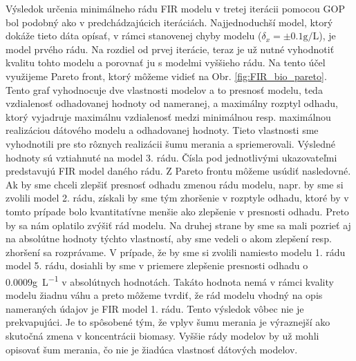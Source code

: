 Výsledok určenia minimálneho rádu FIR modelu v tretej iterácii pomocou GOP bol podobný ako v predchádzajúcich iteráciách. Najjednoduchší model, ktorý dokáže tieto dáta opísať, v rámci stanovenej chyby modelu ($ \delta_{x}=\pm0.1\si{\gram\per\liter} $), je model prvého rádu.
Na rozdiel od prvej iterácie, teraz je už nutné vyhodnotiť kvalitu tohto modelu a porovnať ju s modelmi vyššieho rádu. Na tento účel využijeme Pareto front, ktorý môžeme vidieť na Obr. \ref{fig:FIR_bio_pareto}. Tento graf vyhodnocuje dve vlastnosti modelov a to presnosť modelu, teda vzdialenosť odhadovanej hodnoty od nameranej, a maximálny rozptyl odhadu, ktorý vyjadruje maximálnu vzdialenosť medzi minimálnou resp. maximálnou realizáciou dátového modelu a odhadovanej hodnoty. Tieto vlastnosti sme vyhodnotili pre sto rôznych realizácii šumu merania a spriemerovali. Výsledné
hodnoty sú vztiahnuté na model 3. rádu. Čísla pod jednotlivými ukazovateľmi predstavujú FIR model daného rádu. Z Pareto frontu môžeme usúdiť nasledovné. Ak by sme chceli zlepšiť presnosť odhadu zmenou rádu modelu, napr. by sme si zvolili model 2. rádu, získali by sme tým zhoršenie v rozptyle odhadu, ktoré by v tomto prípade bolo kvantitatívne menšie ako zlepšenie v presnosti odhadu. Preto by sa nám oplatilo zvýšiť rád modelu. Na druhej strane by sme sa mali pozrieť aj na absolútne hodnoty týchto vlastností, aby sme vedeli o akom zlepšení resp. zhoršení sa rozprávame. V prípade, že by sme si zvolili namiesto modelu 1. rádu model 5. rádu, dosiahli by sme v priemere zlepšenie presnosti odhadu o 0.0009\si{\gram\per\liter} v absolútnych hodnotách. Takáto hodnota nemá v rámci kvality modelu žiadnu váhu a preto môžeme tvrdiť, že rád modelu vhodný na opis nameraných údajov je FIR model 1. rádu. Tento výsledok vôbec nie je prekvapujúci. Je to spôsobené tým, že vplyv šumu merania je výraznejší ako skutočná zmena v koncentrácii biomasy. Vyššie rády modelov by už mohli opisovať šum merania, čo nie je žiadúca vlastnosť dátových modelov. 

